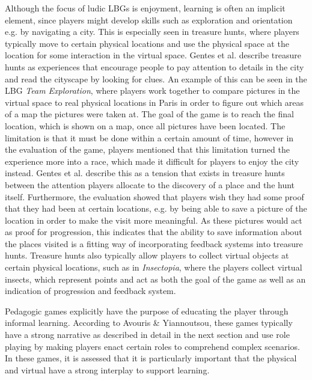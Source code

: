 Although the focus of ludic LBGs is enjoyment, learning is often an implicit element, since players might develop skills such as exploration and orientation e.g. by navigating a city. This is especially seen in treasure hunts, where players typically move to certain physical locations and use the physical space at the location for some interaction in the virtual space. Gentes et al. describe treasure hunts as experiences that encourage people to pay attention to details in the city and read the cityscape by looking for clues. An example of this can be seen in the LBG \textit{Team Exploration}, where players work together to compare pictures in the virtual space to real physical locations in Paris in order to figure out which areas of a map the pictures were taken at\cite{GamingOnTheMove}. The goal of the game is to reach the final location, which is shown on a map, once all pictures have been located. The limitation is that it must be done within a certain amount of time, however in the evaluation of the game, players mentioned that this limitation turned the experience more into a race, which made it difficult for players to enjoy the city instead. Gentes et al. describe this as a tension that exists in treasure hunts between the attention players allocate to the discovery of a place and the hunt itself\cite{GamingOnTheMove}. Furthermore, the evaluation showed that players wish they had some proof that they had been at certain locations, e.g. by being able to save a picture of the location in order to make the visit more meaningful. As these pictures would act as proof for progression, this indicates that the ability to save information about the places visited is a fitting way of incorporating feedback systems into treasure hunts. Treasure hunts also typically allow players to collect virtual objects at certain physical locations\cite{LBG_Review}, such as in \textit{Insectopia}, where the players collect virtual insects, which represent points and act as both the goal of the game as well as an indication of progression and feedback system\cite{Insectopia}.

Pedagogic games explicitly have the purpose of educating the player through informal learning\cite{LBG_Review}. According to Avouris \& Yiannoutsou, these games typically have a strong narrative as described in detail in the next section and use role playing by making players enact certain roles to comprehend complex scenarios\cite{LBG_Review}. In these games, it is assessed that it is particularly important that the physical and virtual have a strong interplay to support learning. 

